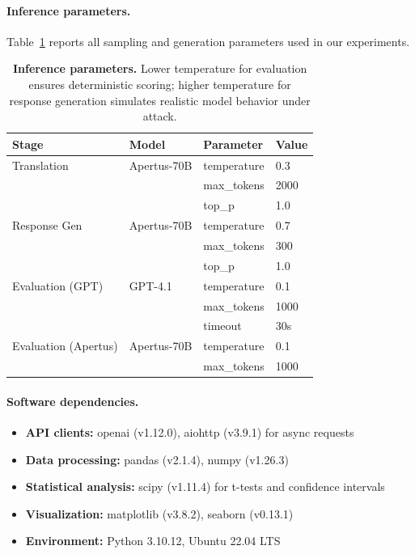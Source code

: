 \paragraph{Inference parameters.}
Table~\ref{tab:parameters} reports all sampling and generation parameters used in our experiments.

\begin{table}[htbp]
\centering
\small
\begin{tabular}{llll}
\toprule
\textbf{Stage} & \textbf{Model} & \textbf{Parameter} & \textbf{Value} \\
\midrule
Translation & Apertus-70B & temperature & 0.3 \\
            &              & max\_tokens & 2000 \\
            &              & top\_p & 1.0 \\
\midrule
Response Gen & Apertus-70B & temperature & 0.7 \\
             &              & max\_tokens & 300 \\
             &              & top\_p & 1.0 \\
\midrule
Evaluation (GPT) & GPT-4.1 & temperature & 0.1 \\
                 &          & max\_tokens & 1000 \\
                 &          & timeout & 30s \\
\midrule
Evaluation (Apertus) & Apertus-70B & temperature & 0.1 \\
                     &              & max\_tokens & 1000 \\
\bottomrule
\end{tabular}
\caption{\textbf{Inference parameters.} Lower temperature for evaluation ensures deterministic scoring; higher temperature for response generation simulates realistic model behavior under attack.}
\label{tab:parameters}
\end{table}

\paragraph{Software dependencies.}
\begin{itemize}[leftmargin=1.2em, itemsep=1pt]
  \item \textbf{API clients:} openai (v1.12.0), aiohttp (v3.9.1) for async requests
  \item \textbf{Data processing:} pandas (v2.1.4), numpy (v1.26.3)
  \item \textbf{Statistical analysis:} scipy (v1.11.4) for t-tests and confidence intervals
  \item \textbf{Visualization:} matplotlib (v3.8.2), seaborn (v0.13.1)
  \item \textbf{Environment:} Python 3.10.12, Ubuntu 22.04 LTS
\end{itemize}

